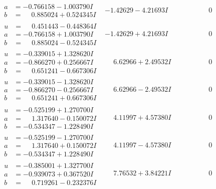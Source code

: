 \documentclass[1p]{elsarticle_modified}
\theoremstyle{definition}
\begin{document}
$$\begin{array}{c|c|c}
\begin{aligned}
a &= -0.766158 - 1.003790 I \\
b &= \phantom{-}0.885024 + 0.524345 I\end{aligned}
 & -1.42629 - 4.21693 I & \phantom{-0.000000 } 0 \\ \hline\begin{aligned}
u &= \phantom{-}0.451443 - 0.448364 I \\
a &= -0.766158 + 1.003790 I \\
b &= \phantom{-}0.885024 - 0.524345 I\end{aligned}
 & -1.42629 + 4.21693 I & \phantom{-0.000000 } 0 \\ \hline\begin{aligned}
u &= -0.339015 + 1.328620 I \\
a &= -0.866270 + 0.256667 I \\
b &= \phantom{-}0.651241 - 0.667306 I\end{aligned}
 & \phantom{-}6.62966 + 2.49532 I & \phantom{-0.000000 } 0 \\ \hline\begin{aligned}
u &= -0.339015 - 1.328620 I \\
a &= -0.866270 - 0.256667 I \\
b &= \phantom{-}0.651241 + 0.667306 I\end{aligned}
 & \phantom{-}6.62966 - 2.49532 I & \phantom{-0.000000 } 0 \\ \hline\begin{aligned}
u &= -0.525199 + 1.270700 I \\
a &= \phantom{-}1.317640 - 0.150072 I \\
b &= -0.534347 - 1.228490 I\end{aligned}
 & \phantom{-}4.11997 + 4.57380 I & \phantom{-0.000000 } 0 \\ \hline\begin{aligned}
u &= -0.525199 - 1.270700 I \\
a &= \phantom{-}1.317640 + 0.150072 I \\
b &= -0.534347 + 1.228490 I\end{aligned}
 & \phantom{-}4.11997 - 4.57380 I & \phantom{-0.000000 } 0 \\ \hline\begin{aligned}
u &= -0.385001 + 1.327700 I \\
a &= -0.939073 + 0.367520 I \\
b &= \phantom{-}0.719261 - 0.232376 I\end{aligned}
 & \phantom{-}7.76532 + 3.84221 I & \phantom{-0.000000 } 0 \\ \hline\begin{aligned}

\end{aligned}
\end{array}$$
\end{document}
